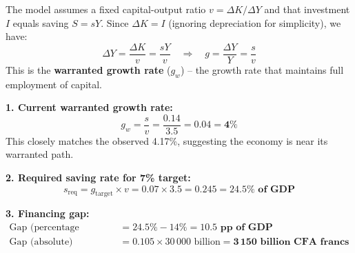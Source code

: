 \documentclass[11pt]{article}
\begin{document}
\begin{propriete}
The model assumes a fixed capital-output ratio $v = \Delta K / \Delta Y$ and that investment $I$ equals saving $S = sY$. Since $\Delta K = I$ (ignoring depreciation for simplicity), we have:
\[
\Delta Y = \frac{\Delta K}{v} = \frac{sY}{v} \quad \Rightarrow \quad g = \frac{\Delta Y}{Y} = \frac{s}{v}
\]
This is the \textbf{warranted growth rate} ($g_w$) -- the growth rate that maintains full employment of capital.
\end{propriete}

\begin{exemplebox}
\textbf{1. Current warranted growth rate:}
\[
g_w = \frac{s}{v} = \frac{0.14}{3.5} = 0.04 = \mathbf{4\%}
\]
This closely matches the observed 4.17\%, suggesting the economy is near its warranted path.

\textbf{2. Required saving rate for 7\% target:}
\[
s_{\text{req}} = g_{\text{target}} \times v = 0.07 \times 3.5 = 0.245 = \mathbf{24.5\% \text{ of GDP}}
\]

\textbf{3. Financing gap:}
\begin{align*}
\text{Gap (percentage points)} &= 24.5\% - 14\% = \mathbf{10.5 \text{ pp of GDP}} \\
\text{Gap (absolute)} &= 0.105 \times 30\,000 \text{ billion} = \mathbf{3\,150 \text{ billion CFA francs}}
\end{align*}
\end{exemplebox}
\end{document}

